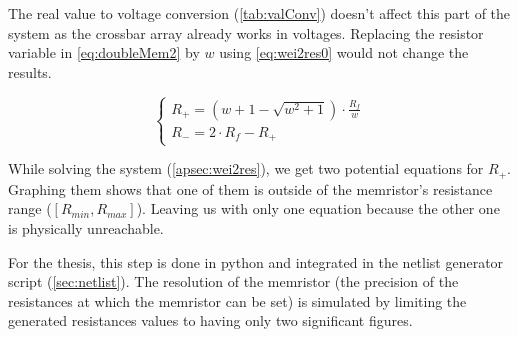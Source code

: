 The real value to voltage conversion (\cref{tab:valConv}) doesn't affect this part of the system as the crossbar array already works in voltages. Replacing the resistor variable in \cref{eq:doubleMem2} by $w$ using \cref{eq:wei2res0} would not change the results.

\begin{equation}
  \label{eq:wei2res2}
  \begin{cases}
    R_+= (w+1-\sqrt{w^2+1})\cdot\frac{R_f}{w}\\
    R_-=2\cdot R_f -R_+
  \end{cases}
\end{equation}

While solving the system (\cref{apsec:wei2res}), we get two potential equations for $R_+$. Graphing them shows that one of them is outside of the memristor's resistance range ($[R_{min},R_{max}]$). Leaving us with only one equation because the other one is physically unreachable.

For the thesis, this step is done in python and integrated in the netlist generator script (\cref{sec:netlist}). The resolution of the memristor (the precision of the resistances at which the memristor can be set) is simulated by limiting the generated resistances values to having only two significant figures.
